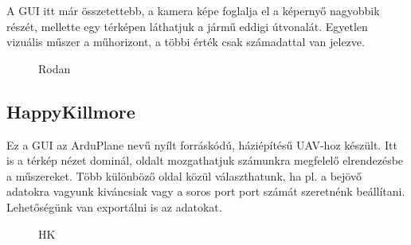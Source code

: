 \documentclass[12pt]{article}
\begin{document}
A GUI itt már összetettebb, a kamera képe foglalja el a képerny\H{o} nagyobbik részét, mellette egy térképen láthatjuk a járm\H{u} eddigi útvonalát. Egyetlen vizuális m\H{u}szer a m\H{u}horizont, a többi érték csak számadattal van jelezve.

\begin{figure}[H]
	\centering
	\caption{Rodan}
	\label{fig:rodan}
\end{figure}

\subsection{HappyKillmore}
\cite{bib:hk} Ez a GUI az ArduPlane nev\H{u} nyílt forráskódú, háziépítés\H{u} UAV-hoz készült.
Itt is a térkép nézet dominál, oldalt mozgathatjuk számunkra megfelel\H{o} elrendezésbe a m\H{u}szereket.
Több különböz\H{o} oldal közül választhatunk, ha pl. a bejöv\H{o} adatokra vagyunk kiváncsiak vagy a soros port port számát szeretnénk beállítani. Lehet\H{o}ségünk van exportálni is az adatokat.


\begin{figure}[!h]
	\centering
		\caption{HK}
	\label{fig:hk}
\end{figure}
\end{document}
